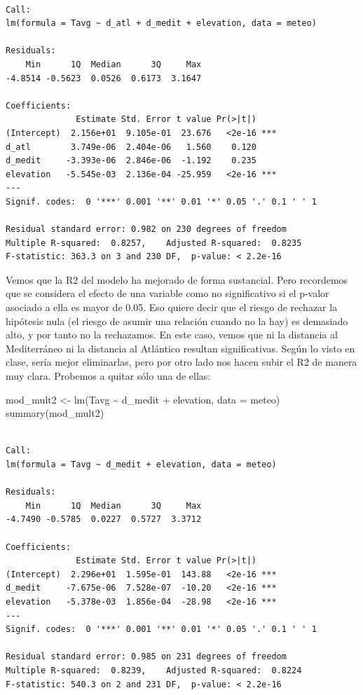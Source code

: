 \documentclass[
  letterpaper,
  DIV=11,
  numbers=noendperiod]{scrreprt}
\newenvironment{Shaded}{\begin{snugshade}}{\end{snugshade}}
\newcommand{\AttributeTok}[1]{\textcolor[rgb]{0.40,0.45,0.13}{#1}}
\newcommand{\FunctionTok}[1]{\textcolor[rgb]{0.28,0.35,0.67}{#1}}
\newcommand{\NormalTok}[1]{\textcolor[rgb]{0.00,0.23,0.31}{#1}}
\newcommand{\OtherTok}[1]{\textcolor[rgb]{0.00,0.23,0.31}{#1}}
\newcommand{\SpecialCharTok}[1]{\textcolor[rgb]{0.37,0.37,0.37}{#1}}
\begin{document}
\begin{verbatim}

Call:
lm(formula = Tavg ~ d_atl + d_medit + elevation, data = meteo)

Residuals:
    Min      1Q  Median      3Q     Max 
-4.8514 -0.5623  0.0526  0.6173  3.1647 

Coefficients:
              Estimate Std. Error t value Pr(>|t|)    
(Intercept)  2.156e+01  9.105e-01  23.676   <2e-16 ***
d_atl        3.749e-06  2.404e-06   1.560    0.120    
d_medit     -3.393e-06  2.846e-06  -1.192    0.235    
elevation   -5.545e-03  2.136e-04 -25.959   <2e-16 ***
---
Signif. codes:  0 '***' 0.001 '**' 0.01 '*' 0.05 '.' 0.1 ' ' 1

Residual standard error: 0.982 on 230 degrees of freedom
Multiple R-squared:  0.8257,    Adjusted R-squared:  0.8235 
F-statistic: 363.3 on 3 and 230 DF,  p-value: < 2.2e-16
\end{verbatim}

Vemos que la R2 del modelo ha mejorado de forma sustancial. Pero
recordemos que se considera el efecto de una variable como no
significativo si el p-valor asociado a ella es mayor de 0.05. Eso quiere
decir que el riesgo de rechazar la hipótesis nula (el riesgo de asumir
una relación cuando no la hay) es demasiado alto, y por tanto no la
rechazamos. En este caso, vemos que ni la distancia al Mediterráneo ni
la distancia al Atlántico resultan significativas. Según lo visto en
clase, sería mejor eliminarlas, pero por otro lado nos hacen subir el R2
de manera muy clara. Probemos a quitar sólo una de ellas:

\begin{Shaded}
\begin{Highlighting}[]
\NormalTok{mod\_mult2 }\OtherTok{\textless{}{-}} \FunctionTok{lm}\NormalTok{(Tavg }\SpecialCharTok{\textasciitilde{}}\NormalTok{ d\_medit }\SpecialCharTok{+}\NormalTok{ elevation, }\AttributeTok{data =}\NormalTok{ meteo)}
\FunctionTok{summary}\NormalTok{(mod\_mult2)}
\end{Highlighting}
\end{Shaded}

\begin{verbatim}

Call:
lm(formula = Tavg ~ d_medit + elevation, data = meteo)

Residuals:
    Min      1Q  Median      3Q     Max 
-4.7490 -0.5785  0.0227  0.5727  3.3712 

Coefficients:
              Estimate Std. Error t value Pr(>|t|)    
(Intercept)  2.296e+01  1.595e-01  143.88   <2e-16 ***
d_medit     -7.675e-06  7.528e-07  -10.20   <2e-16 ***
elevation   -5.378e-03  1.856e-04  -28.98   <2e-16 ***
---
Signif. codes:  0 '***' 0.001 '**' 0.01 '*' 0.05 '.' 0.1 ' ' 1

Residual standard error: 0.985 on 231 degrees of freedom
Multiple R-squared:  0.8239,    Adjusted R-squared:  0.8224 
F-statistic: 540.3 on 2 and 231 DF,  p-value: < 2.2e-16
\end{verbatim}
\end{document}
